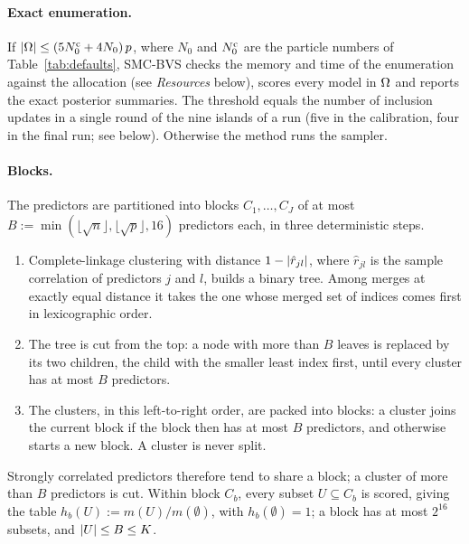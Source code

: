 \paragraph{Exact enumeration.} If $\lvert \Omega\rvert\le(5N^{\mathrm c}_0+4N_0)\,p$, where $N_0$ and $N^{\mathrm c}_0$ are the particle numbers of
Table~\ref{tab:defaults}, SMC-BVS checks the memory and time of the enumeration against the allocation (see
\emph{Resources} below), scores every model in $\Omega$ and reports the exact posterior summaries. The
threshold equals the number of inclusion updates in a single round of the nine islands of a run (five in the
calibration, four in the final run; see below). Otherwise the method runs the sampler.

\paragraph{Blocks.} The predictors are partitioned into blocks $C_1,\dots,C_J$ of at most
$B:=\min(\lfloor\sqrt n\rfloor,\lfloor\sqrt p\rfloor,16)$ predictors each, in three deterministic steps.
\begin{enumerate}[label=(\roman*)]
  \item Complete-linkage clustering with distance $1-\lvert \hat r_{jl}\rvert$, where $\hat r_{jl}$ is the sample
    correlation of predictors $j$ and $l$, builds a binary tree. Among merges at exactly equal distance it takes the
    one whose merged set of indices comes first in lexicographic order.
  \item The tree is cut from the top: a node with more than $B$ leaves is replaced by its two children, the child with
    the smaller least index first, until every cluster has at most $B$ predictors.
  \item The clusters, in this left-to-right order, are packed into blocks: a cluster joins the current block if the
    block then has at most $B$ predictors, and otherwise starts a new block. A cluster is never split.
\end{enumerate}
Strongly correlated predictors therefore tend to share a block; a cluster of more than $B$ predictors is cut. Within block $C_b$, every subset $U\subseteq C_b$ is scored,
giving the table $h_b(U):=m(U)/m(\emptyset)$, with $h_b(\emptyset)=1$; a block has at most $2^{16}$ subsets, and
$\lvert U\rvert\le B\le K$.

